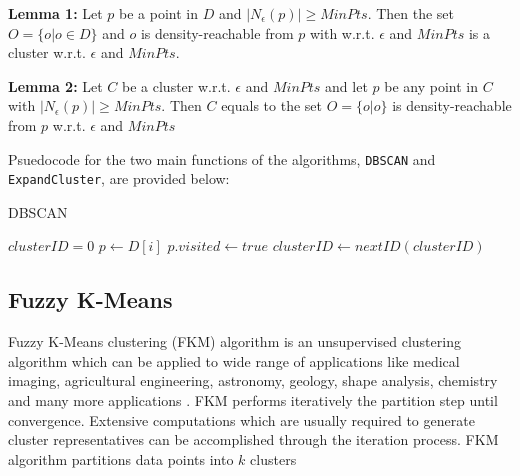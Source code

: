 \documentclass[conference, 10pt]{IEEEtran}
\begin{document}
  \begin{description}
    \item{\textbf{Lemma 1:}} Let $p$ be a point in $D$ and $|N_{\epsilon}(p)| \geq MinPts$. Then the set $O = \{o | o \in D \}$ and $o$ is density-reachable from $p$ with w.r.t. $\epsilon$ and $MinPts$ is a cluster w.r.t. $\epsilon$ and $MinPts$.
    \item{\textbf{Lemma 2:}} Let $C$ be a cluster w.r.t. $\epsilon$ and $MinPts$ and let $p$ be any point in $C$ with $|N_{\epsilon}(p)| \geq MinPts$. Then $C$ equals to the set $O = \{o | o\}$ is density-reachable from $p$ w.r.t. $\epsilon$ and $MinPts$
  \end{description}
  Psuedocode for the two main functions of the algorithms, \texttt{DBSCAN} and \texttt{ExpandCluster}, are provided below:

  \begin{algorithm}
  \caption{DBSCAN}
  \begin{algorithmic}[1]
    \State $clusterID = 0$
        \State $p \gets D[i]$
        \State $p.visited \gets true$    
            \State $clusterID \gets nextID(clusterID)$
          \EndIf
        \EndIf
    \EndFor
  \EndProcedure
  \Statex
  \EndProcedure
  \end{algorithmic}
  \end{algorithm}

  \subsection{Fuzzy K-Means}
  Fuzzy K-Means clustering (FKM) algorithm is an unsupervised clustering algorithm which can be
  applied to wide range of applications like medical imaging, agricultural engineering, astronomy,
  geology, shape analysis, chemistry and many more applications \cite{pattern}. FKM performs iteratively the partition step until convergence. Extensive computations which are usually required to generate cluster representatives can be accomplished through the iteration process. FKM algorithm partitions data points into $k$ clusters
\end{document}
